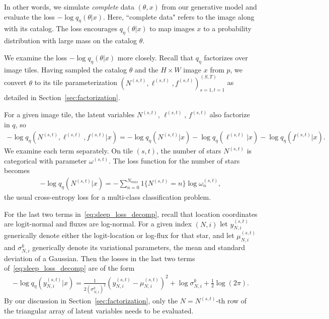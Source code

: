 In other words, we simulate {\itshape complete} data $(\theta, x)$ from our generative model and evaluate the loss $-\log q_\eta(\theta | x)$. 
Here, ``complete data" refers to the image along with its catalog. 
The loss encourages $q_{\eta}(\theta | x)$ to map images $x$ to a probability distribution with large mass on the 
catalog $\theta$.

We examine the loss $-\log q_\eta(\theta | x)$ more closely. Recall that $q_\eta$ factorizes over image tiles. Having sampled the catalog $\theta$ 
and the $H\times W$ image $x$ from $p$, we convert $\theta$ to its tile parameterization $(N^{(s,t)}, \ell^{(s,t)}, f^{(s,t)})_{s=1,t=1}^{(S,T)}$ as detailed in Section~\ref{sec:factorization}.

For a given image tile, the latent variables $N^{(s,t)}$, $\ell^{(s,t)}$, $f^{(s,t)}$ also factorize in $q$, so 
\begin{align}
- \log q_\eta(N^{(s,t)}, \ell^{(s,t)}, f^{(s,t)} | x) =         - \log q_\eta(N^{(s,t)} | x) 
        - \log q_\eta(\ell^{(s,t)} | x) 
        - \log q_\eta(f^{(s,t)} | x). 
        \label{eq:sleep_loss_decomp}
\end{align}
We examine each term separately. On tile $(s,t)$, the number of stars $N^{(s,t)}$ is categorical with parameter $\omega^{(s,t)}$. The loss function for the number of stars becomes
\begin{align}
    - \log q_\eta(N^{(s,t)} | x) = -\sum_{n = 0}^{N_{max}} 1\{N^{(s,t)} = n\} \log \omega^{(s,t)}_n, 
\end{align}
the usual cross-entropy loss for a multi-class classification problem. 

For the last two terms in~\eqref{eq:sleep_loss_decomp}, recall that location coordinates are logit-normal and fluxes are log-normal. For a given index $(N,i)$ let $y^{(s,t)}_{N,i}$ generically denote either the 
logit-location or log-flux for that star, 
and let $\mu^{(s,t)}_{N,i}$ and $\sigma^{k}_{N,i}$ generically denote its variational parameters,
the mean and standard deviation of a Gaussian. Then the losses in the last two terms of~\eqref{eq:sleep_loss_decomp} are of the form 
\begin{align}
    -\log q_\eta(y^{(s,t)}_{N,i} | x) = 
        \frac{1}{2(\sigma^{k}_{N,i})^2}(y^{(s,t)}_{N,i} - \mu^{(s,t)}_{N,i})^2
         + \log\sigma^{k}_{N,i}
         + \frac{1}{2}\log(2\pi).
\end{align}
By our discussion in Section~\ref{sec:factorization}, 
only the $N = N^{(s,t)}$-th row of the triangular 
array of latent variables needs to be evaluated. 

